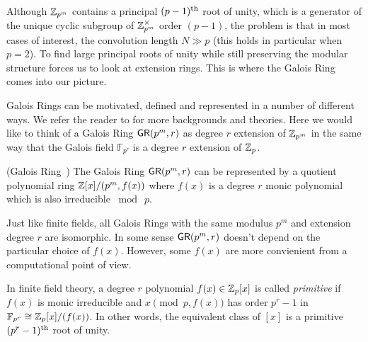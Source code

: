 Although \(\mathbb{Z}_{p^m}\) contains a principal \((p-1)\textsuperscript{th}\) root of unity, which is a generator of the unique cyclic subgroup of \(\mathbb{Z}_{p^m}^{\times}\) order \((p - 1)\), the problem is that in most cases of interest, the convolution length \(N \gg p\) (this holds in particular when \(p = 2\)). To find large principal roots of unity while still preserving the modular structure forces us to look at extension rings. This is where the Galois Ring comes into our picture.

Galois Rings can be motivated, defined and represented in a number of different ways. We refer the reader to \cite{BOOK:GilFla12,BOOK:Macdonald74} for more backgrounds and theories. Here we would like to think of a Galois Ring \(\mathsf{GR}(p^m, r)\) as degree \(r\) extension of \(\mathbb{Z}_{p^m}\) in the same way that the Galois field \(\mathbb{F}_{p^r}\) is a degree \(r\) extension of \(\mathbb{Z}_p\).

\begin{definition}{(Galois Ring~\cite{MISC:WikiGalRing})} \label{def:GaloisRing}
    The Galois Ring \(\mathsf{GR}(p^m, r)\) can be represented by a quotient polynomial ring \(\mathbb{Z}[x] / (p^m, f(x))\) where \(f(x)\) is a degree \(r\) monic polynomial which is also irreducible \(\bmod \  p\).
\end{definition}

Just like finite fields, all Galois Rings with the same modulus \(p^m\) and extension degree \(r\) are isomorphic. In some sense \(\mathsf{GR}(p^m, r)\) doesn't depend on the particular choice of \(f(x)\). However, some \(f(x)\) are more convienient from a computational point of view.

In finite field theory, a degree \(r\) polynomial \(f(x) \in \mathbb{Z}_p[x]\) is called \emph{primitive} if \(f(x)\) is monic irreducible and \(x \pmod{p, f(x)}\) has order \(p^r - 1\) in \(\mathbb{F}_{p^r} \cong \mathbb{Z}_p[x]/(f(x))\). In other words, the equivalent class of \([x]\) is a primitive \((p^r - 1)\textsuperscript{th}\) root of unity.

